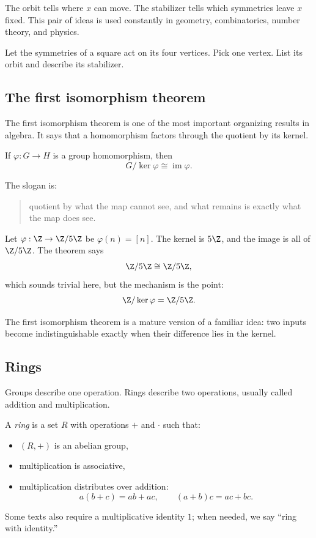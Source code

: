 The orbit tells where $x$ can move. The stabilizer tells which symmetries leave
$x$ fixed. This pair of ideas is used constantly in geometry, combinatorics,
number theory, and physics.

\begin{labbox}
Let the symmetries of a square act on its four vertices. Pick one vertex. List
its orbit and describe its stabilizer.
\end{labbox}

\subsection{The first isomorphism theorem}

The first isomorphism theorem is one of the most important organizing results
in algebra. It says that a homomorphism factors through the quotient by its
kernel.

\begin{theorem}
If $\varphi:G\to H$ is a group homomorphism, then
\[
G/\ker\varphi\cong \operatorname{im}\varphi.
\]
\end{theorem}

The slogan is:

\begin{quote}
quotient by what the map cannot see, and what remains is exactly what the map
does see.
\end{quote}

\begin{example}
Let $\varphi:\Z\to\Z/5\Z$ be $\varphi(n)=[n]$. The kernel is $5\Z$, and the
image is all of $\Z/5\Z$. The theorem says
\[
\Z/5\Z\cong \Z/5\Z,
\]
which sounds trivial here, but the mechanism is the point:
\[
\Z/\ker\varphi=\Z/5\Z.
\]
\end{example}

\begin{focusbox}
The first isomorphism theorem is a mature version of a familiar idea: two inputs
become indistinguishable exactly when their difference lies in the kernel.
\end{focusbox}

\subsection{Rings}

Groups describe one operation. Rings describe two operations, usually called
addition and multiplication.

\begin{definition}
A \emph{ring} is a set $R$ with operations $+$ and $\cdot$ such that:
\begin{itemize}
\item $(R,+)$ is an abelian group,
\item multiplication is associative,
\item multiplication distributes over addition:
\[
a(b+c)=ab+ac,\qquad (a+b)c=ac+bc.
\]
\end{itemize}
Some texts also require a multiplicative identity $1$; when needed, we say
``ring with identity.''
\end{definition}

